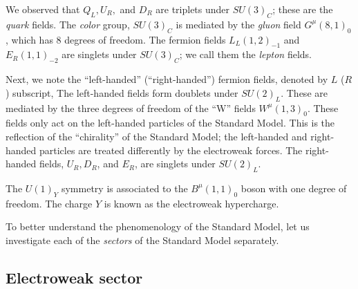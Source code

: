 We observed that $Q_L, U_R,$ and $D_R$ are triplets under $SU(3)_C$; these are the \textit{quark} fields.
The \textit{color} group, $SU(3)_C$ is mediated by the \textit{gluon} field $G^\mu(8,1)_0$, which has 8 degrees of freedom.
The fermion fields $L_L(1,2)_{-1}$ and $  E_R(1,1)_{-2} $ are singlets under $SU(3)_C$; we call them the \textit{lepton} fields.

Next, we note the ``left-handed'' (``right-handed'') fermion fields, denoted by $L$ ($R$) subscript,
The left-handed fields form doublets under $SU(2)_L$.
These are mediated by the three degrees of freedom of the  ``W'' fields $W^\mu(1,3)_0$.
These fields only act on the left-handed particles of the Standard Model.
This is the reflection of the ``chirality'' of the Standard Model; the left-handed and right-handed particles are treated differently by the electroweak forces.
The right-handed fields, $U_R, D_R$, and $E_R$, are singlets under $SU(2)_L$.

The $U(1)_Y$ symmetry is associated to the $B^\mu(1,1)_0$ boson with one degree of freedom.
The charge $Y$ is known as the electroweak hypercharge.

To better understand the phenomenology of the Standard Model, let us investigate each of the \textit{sectors} of the Standard Model separately.

\subsection{Electroweak sector}

